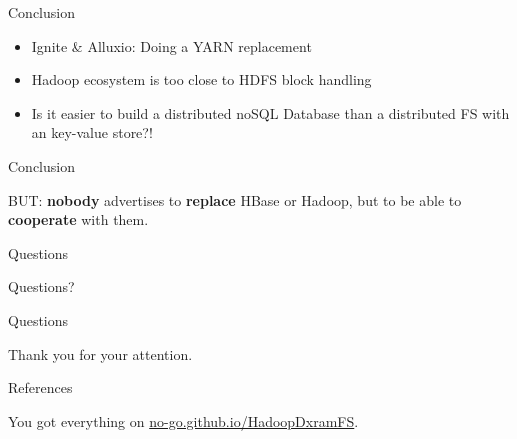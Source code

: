 \begin{frame}{Conclusion}
\protect\hypertarget{conclusion-1}{}

\begin{itemize}
\tightlist
\item
  Ignite \& Alluxio: Doing a YARN replacement
\item
  Hadoop ecosystem is too close to HDFS block handling
\item
  Is it easier to build a distributed noSQL Database than a distributed
  FS with an key-value store?!
\end{itemize}

\end{frame}

\begin{frame}{Conclusion}
\protect\hypertarget{conclusion-2}{}

BUT: \textbf{nobody} advertises to \textbf{replace} HBase or Hadoop, but
to be able to \textbf{cooperate} with them.

\end{frame}

\begin{frame}{Questions}
\protect\hypertarget{questions}{}

Questions?

\end{frame}

\begin{frame}{Questions}
\protect\hypertarget{questions-1}{}

Thank you for your attention.

\end{frame}

\begin{frame}{References}
\protect\hypertarget{references}{}

You got everything on
\href{https://no-go.github.io/HadoopDxramFS}{no-go.github.io/HadoopDxramFS}.

\end{frame}
